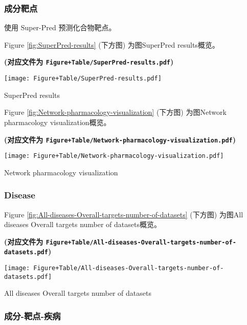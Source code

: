 \documentclass[
]{article}
\begin{document}
\hypertarget{ux6210ux5206ux9776ux70b9}{%
\subsubsection{成分靶点}\label{ux6210ux5206ux9776ux70b9}}

使用 Super-Pred 预测化合物靶点。

Figure \ref{fig:SuperPred-results} (下方图) 为图SuperPred results概览。

\textbf{(对应文件为 \texttt{Figure+Table/SuperPred-results.pdf})}

\def\@captype{figure}
\begin{center}
\texttt{[image: Figure+Table/SuperPred-results.pdf]}
\caption{SuperPred results}\label{fig:SuperPred-results}
\end{center}

Figure \ref{fig:Network-pharmacology-visualization} (下方图) 为图Network pharmacology visualization概览。

\textbf{(对应文件为 \texttt{Figure+Table/Network-pharmacology-visualization.pdf})}

\def\@captype{figure}
\begin{center}
\texttt{[image: Figure+Table/Network-pharmacology-visualization.pdf]}
\caption{Network pharmacology visualization}\label{fig:Network-pharmacology-visualization}
\end{center}

\hypertarget{disease}{%
\subsubsection{Disease}\label{disease}}

Figure \ref{fig:All-diseases-Overall-targets-number-of-datasets} (下方图) 为图All diseases Overall targets number of datasets概览。

\textbf{(对应文件为 \texttt{Figure+Table/All-diseases-Overall-targets-number-of-datasets.pdf})}

\def\@captype{figure}
\begin{center}
\texttt{[image: Figure+Table/All-diseases-Overall-targets-number-of-datasets.pdf]}
\caption{All diseases Overall targets number of datasets}\label{fig:All-diseases-Overall-targets-number-of-datasets}
\end{center}

\hypertarget{ux6210ux5206-ux9776ux70b9-ux75beux75c5}{%
\subsubsection{成分-靶点-疾病}\label{ux6210ux5206-ux9776ux70b9-ux75beux75c5}}
\end{document}
